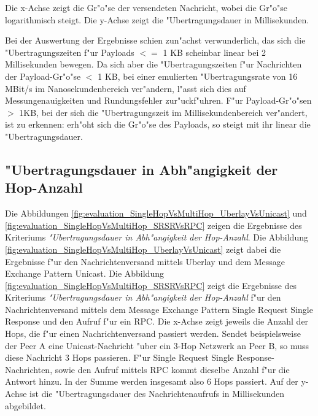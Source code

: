 Die x-Achse zeigt die Gr"o"se der versendeten Nachricht, wobei die Gr"o"se logarithmisch steigt. Die y-Achse zeigt die "Uber\-tra\-gungs\-dauer in Millisekunden.

Bei der Auswertung der Ergebnisse schien zun"achst verwunderlich, das sich die "Ubertragungszeiten f"ur Payloads $<=$ 1 KB scheinbar linear bei 2 Millisekunden bewegen. Da sich aber die "Ubertragungszeiten f"ur Nachrichten der Payload-Gr"o"se $<$ 1 KB, bei einer emulierten "Ubertragungsrate von 16 MBit/s im Nanosekundenbereich ver"andern, l"asst sich dies auf Messungenauigkeiten und Rundungsfehler zur"uckf"uhren. F"ur Payload-Gr"o"sen $>$ 1KB, bei der sich die "Ubertragungszeit  im Millisekundenbereich ver"andert, ist zu erkennen: erh"oht sich die Gr"o"se des Payloads, so steigt mit ihr linear die "Uber\-tra\-gungs\-dauer.

\subsection{"Ubertragungsdauer in Abh"angigkeit der Hop-Anzahl}



Die Abbildungen \ref{fig:evaluation_SingleHopVsMultiHop_UberlayVsUnicast} und \ref{fig:evaluation_SingleHopVsMultiHop_SRSRVsRPC} zeigen die Ergebnisse des Kriteriums \emph{"Ubertragungsdauer in Abh"angigkeit der Hop-Anzahl}. Die Abbildung \ref{fig:evaluation_SingleHopVsMultiHop_UberlayVsUnicast} zeigt dabei die Ergebnisse f"ur den Nachrichtenversand mittels Uberlay und dem Message Exchange Pattern Unicast. Die Abbildung \ref{fig:evaluation_SingleHopVsMultiHop_SRSRVsRPC} zeigt die Ergebnisse des Kriteriums \emph{"Ubertragungsdauer in Abh"angigkeit der Hop-Anzahl} f"ur den Nachrichtenversand mittels dem Message Exchange Pattern Single Request Single Response und den Aufruf f"ur ein RPC. Die  x-Achse zeigt jeweils die Anzahl der Hops, die f"ur einen Nachrichtenversand passiert werden. Sendet beispielsweise der Peer A eine Unicast-Nachricht "uber ein 3-Hop Netzwerk an Peer B, so muss diese Nachricht 3 Hops passieren. F"ur Single Request Single Response-Nachrichten, sowie den Aufruf mittels RPC kommt dieselbe Anzahl f"ur die Antwort hinzu. In der Summe werden insgesamt also 6 Hops passiert. Auf der y-Achse ist die "Uber\-tra\-gungs\-dauer des Nachrichtenaufrufs in Millisekunden abgebildet.

